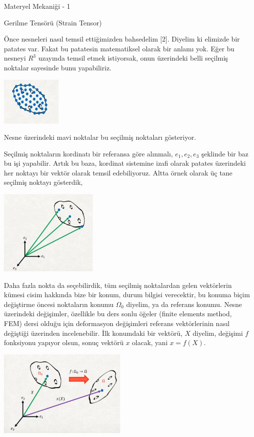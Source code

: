 \documentclass[12pt,fleqn]{article}\usepackage{../../common}
\begin{document}
Materyel Mekaniği - 1

Gerilme Tensörü (Strain Tensor) 

Önce nesneleri nasıl temsil ettiğimizden bahsedelim [2]. Diyelim ki elimizde bir
patates var. Fakat bu patatesin matematiksel olarak bir anlamı yok. Eğer bu
nesneyi $R^3$ uzayında temsil etmek istiyorsak, onun üzerindeki belli seçilmiş
noktalar sayesinde bunu yapabiliriz.

\includegraphics[width=8em]{phy_020_strs_01_01.jpg}

Nesne üzerindeki mavi noktalar bu seçilmiş noktaları gösteriyor.

Seçilmiş noktaların kordinatı bir referansa göre alınmalı, $e_1,e_2,e_3$
şeklinde bir baz bu işi yapabilir. Artık bu baza, kordinat sistemine izafi
olarak patates üzerindeki her noktayı bir vektör olarak temsil edebiliyoruz.
Altta örnek olarak üç tane seçilmiş noktayı gösterdik,

\includegraphics[width=13em]{phy_020_strs_01_02.jpg}

Daha fazla nokta da seçebilirdik, tüm seçilmiş noktalardan gelen vektörlerin
kümesi cisim hakkında bize bir konum, durum bilgisi verecektir, bu konuma biçim
değiştirme öncesi noktaların konumu $\Omega_0$ diyelim, ya da referans konumu.
Nesne üzerindeki değişimler, özellikle bu ders sonlu öğeler (finite elements
method, FEM) dersi olduğu için deformasyon değişimleri referans vektörlerinin
nasıl değiştiği üzerinden incelenebilir. İlk konumdaki bir vektörü, $X$ diyelim,
değişimi $f$ fonksiyonu yapıyor olsun, sonuç vektörü $x$ olacak, yani $x =
f(X)$.

\includegraphics[width=17em]{phy_020_strs_01_03.jpg}
\end{document}

